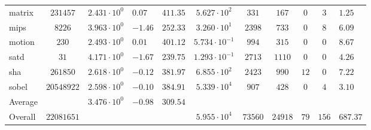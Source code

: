 \begin{tabular}{|l|c|HHc|c|c|c|c|cH|}
matrix        & $ 231457   $ & $ 2.431 \cdot 10^{0} $ & $ 0.07  $ & $ 411.35 $ & $ 5.627 \cdot 10^{2}  $ & $ 331   $ & $ 167   $ & $ 0   $ & $ 3   $ & $ 1.25    $ \\
mips          & $ 8226     $ & $ 3.963 \cdot 10^{0} $ & $ -1.46 $ & $ 252.33 $ & $ 3.260 \cdot 10^{1}  $ & $ 2398  $ & $ 733   $ & $ 0   $ & $ 8   $ & $ 6.09    $ \\
motion        & $ 230      $ & $ 2.493 \cdot 10^{0} $ & $ 0.01  $ & $ 401.12 $ & $ 5.734 \cdot 10^{-1} $ & $ 994   $ & $ 315   $ & $ 0   $ & $ 0   $ & $ 8.67    $ \\
satd          & $ 31       $ & $ 4.171 \cdot 10^{0} $ & $ -1.67 $ & $ 239.75 $ & $ 1.293 \cdot 10^{-1} $ & $ 2713  $ & $ 1110  $ & $ 0   $ & $ 0   $ & $ 4.26    $ \\
sha           & $ 261850   $ & $ 2.618 \cdot 10^{0} $ & $ -0.12 $ & $ 381.97 $ & $ 6.855 \cdot 10^{2}  $ & $ 2423  $ & $ 990   $ & $ 12  $ & $ 0   $ & $ 7.22    $ \\
sobel         & $ 20548922 $ & $ 2.598 \cdot 10^{0} $ & $ -0.10 $ & $ 384.91 $ & $ 5.339 \cdot 10^{4}  $ & $ 907   $ & $ 428   $ & $ 0   $ & $ 4   $ & $ 3.10    $ \\
\hline
Average       & $          $ & $ 3.476 \cdot 10^{0} $ & $ -0.98 $ & $ 309.54 $ & $                     $ & $       $ & $       $ & $     $ & $     $ & $         $ \\
\hline
Overall       & $ 22081651 $ & $                    $ & $       $ & $        $ & $ 5.955 \cdot 10^{4}  $ & $ 73560 $ & $ 24918 $ & $ 79  $ & $ 156 $ & $ 687.37  $ \\
\hline
\end{tabular}
